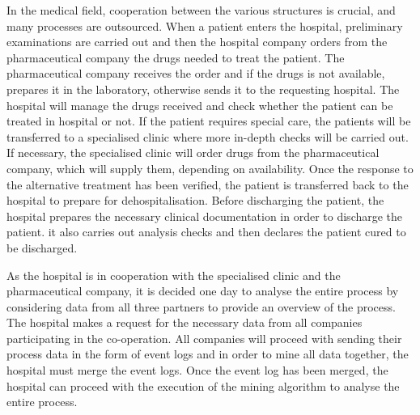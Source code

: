 
In the medical field, cooperation between the various structures is crucial, and many processes are outsourced. 
When a patient enters the hospital, preliminary examinations are carried out and then the hospital company orders from the pharmaceutical company the drugs needed to treat the patient. The pharmaceutical company receives the order and if the drugs is not available, prepares it in the laboratory, otherwise sends it to the requesting hospital. The hospital will manage the drugs received and check whether the patient can be treated in hospital or not. If the patient requires special care, the patients will be transferred to a specialised clinic where more in-depth checks will be carried out. If necessary, the specialised clinic will order drugs from the pharmaceutical company, which will supply them, depending on availability. Once the response to the alternative treatment has been verified, the patient is transferred back to the hospital to prepare for dehospitalisation. Before discharging the patient, the hospital prepares the necessary clinical documentation in order to discharge the patient. it also carries out analysis checks and then declares the patient cured to be discharged.

As the hospital is in cooperation with the specialised clinic and the pharmaceutical company, it is decided one day to analyse the entire process by considering data from all three partners to provide an overview of the process. The hospital makes a request for the necessary data from all companies participating in the co-operation. All companies will proceed with sending their process data in the form of event logs and in order to mine all data together, the hospital must merge the event logs. Once the event log has been merged, the hospital can proceed with the execution of the mining algorithm to analyse the entire process.
